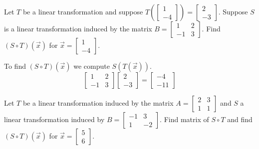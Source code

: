 \documentclass{ximera}
\begin{document}
\begin{problem}\label{prb:6.6} Let $T$ be a linear transformation and suppose $T \left( \left[ \begin{array}{r}
1 \\
-4
\end{array} \right] \right) = \left[ \begin{array}{r}
2 \\
-3
\end{array} \right]$. Suppose $S$ is a linear transformation induced by the matrix $B = \left[ \begin{array}{rr}
1 & 2 \\
-1 & 3
\end{array} \right]$. Find $\left( S \circ T \right) \left( \vec{x} \right)$ for $\vec{x} = \left[ \begin{array}{r}
1 \\
-4
\end{array} \right]$.
\begin{hint}
To find $\left( S \circ T \right) \left( \vec{x} \right)$ we compute $S(T(\vec{x}))$.
\[
\left[ \begin{array}{rr}
1 & 2 \\
-1 & 3
\end{array} \right]
\left[ \begin{array}{r}
2 \\
-3
\end{array} \right]
 = \left[
\begin{array}{r}
-4 \\
-11
\end{array}
\right]
\]
\end{hint}
\end{problem}


\begin{problem}\label{prb:6.7}  Let $T$ be a linear transformation induced by the matrix $A = \left[ \begin{array}{rr}
2 & 3 \\
1 & 1
\end{array}\right]$ and $S$ a linear transformation induced by $B = \left[ \begin{array}{rr}
-1 & 3 \\
1 & -2
\end{array}\right]$. Find matrix of $S \circ T$ and find $\left( S \circ T \right) \left( \vec{x} \right)$ for $\vec{x} = \left[ \begin{array}{r}
5 \\
6
\end{array} \right]$.
\end{problem}
\end{document}

